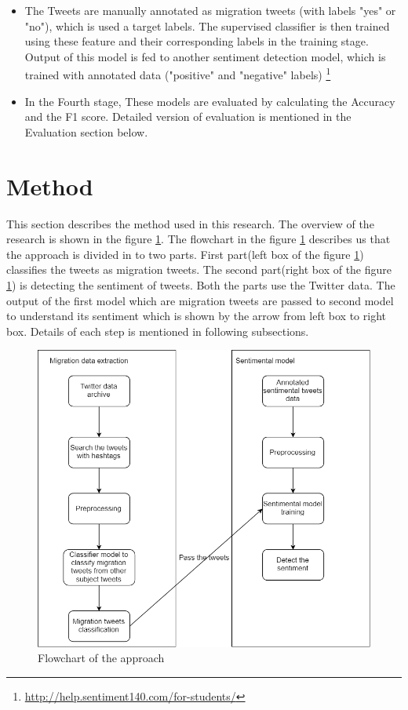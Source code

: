 \begin{itemize}
   \item The Tweets are manually annotated as migration tweets (with labels "yes" or "no"), which is used a target labels. The supervised classifier is then trained
using these feature and their corresponding labels in the training stage. Output of this model is fed to another sentiment detection model, which is trained with annotated data \cite{stanford_data}("positive" and "negative" labels) \footnote{\url{http://help.sentiment140.com/for-students/}}
  
  \item In the Fourth stage, These models are evaluated by calculating the Accuracy and the F1 score. Detailed version of evaluation is mentioned in the Evaluation section below.
\end{itemize}



\section{Method}
This section describes the method used in this research. The overview of the research is shown in the figure \ref{fig:flowchart_thesis}. The flowchart in the figure \ref{fig:flowchart_thesis} describes us that the approach is divided in to two parts. First part(left box of the figure \ref{fig:flowchart_thesis}) classifies the tweets as migration tweets. The second part(right box of the figure \ref{fig:flowchart_thesis}) is detecting the sentiment of tweets. Both the parts use the Twitter data. The output of the first model which are migration tweets are passed to second model to understand its sentiment which is shown by the arrow from left box to right box. Details of each step is mentioned in following subsections.

\begin{figure}
	\centering
	\includegraphics[width=0.75\linewidth]{images/flowchart.png}
	\caption{Flowchart of the approach}
	\label{fig:flowchart_thesis}
\end{figure}
